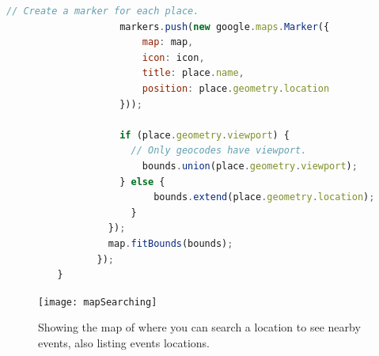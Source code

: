 \documentclass[draftclsnofoot,10pt,onecolumn]{IEEEtran} %
\begin{document}
\begin{center}
\begin{lstlisting}[caption=The eventSearch.html has a mixture of JavaScript and HTML that create the Google Map and search bar along with creating markers for events., language=JavaScript]
                    // Create a marker for each place.
                    markers.push(new google.maps.Marker({
                        map: map,
                        icon: icon,
                        title: place.name,
                        position: place.geometry.location
                    }));
                    
                    if (place.geometry.viewport) {
                      // Only geocodes have viewport.
                        bounds.union(place.geometry.viewport);
                    } else {
                          bounds.extend(place.geometry.location);
                      }
                  });
                  map.fitBounds(bounds);
                });
         }
	\end{lstlisting}
\end{center}

\begin{figure}[H]
  \begin{center}
  
  \texttt{[image: mapSearching]}
  \captionsetup{width=.4\linewidth}
  \centering
  \caption{Showing the map of where you can search a location to see nearby events, also listing events locations. }

  \end{center}
\end{figure}
\end{document}
